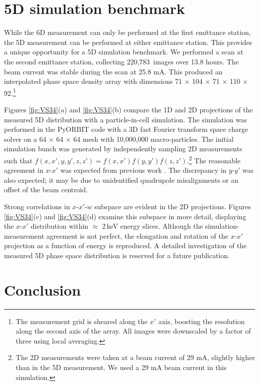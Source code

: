 \documentclass[letterpaper,
               nospread,
               biblatex,
              ]{jacow}
\begin{document}
\section{5D simulation benchmark}

While the 6D measurement can only be performed at the first emittance station, the 5D measurement can be performed at either emittance station. This provides a unique opportunity for a 5D simulation benchmark. We performed a scan at the second emittance station, collecting 220,783~images over 13.8 hours. The beam current was stable during the scan at 25.8 mA. This produced an interpolated phase space density array with dimensions 71 $\times$ 104 $\times$ 71 $\times$ 110 $\times$ 92.\footnote{
    The measurement grid is sheared along the $x'$ axis, boosting the resolution along the second axis of the array. All images were downscaled by a factor of three using local averaging.
} 


Figures \ref{fig:VS34}(a) and \ref{fig:VS34}(b) compare the 1D and 2D projections of the measured 5D distribution with a particle-in-cell simulation. The simulation was performed in the PyORBIT code with a 3D fast Fourier transform space charge solver on a 64 $\times$ 64 $\times$ 64 mesh with 10,000,000 macro-particles. The initial simulation bunch was generated by independently sampling 2D measurements such that $f(x,x',y,y',z,z') = f(x,x')f(y,y')f(z,z')$.\footnote{
    The 2D measurements were taken at a beam current of 29 mA, slightly higher than in the 5D measurement. We used a 29 mA beam current in this simulation.
} The reasonable agreement in $x$-$x'$ was expected from previous work \cite{Ruisard2021-IPAC}. The discrepancy in $y$-$y'$ was also expected; it may be due to unidentified quadrupole misalignments or an offset of the beam centroid. 

Strong correlations in $x$-$x'$-$w$ subspace are evident in the 2D projections. Figures \ref{fig:VS34}(c) and \ref{fig:VS34}(d) examine this subspace in more detail, displaying the $x$-$x'$ distribution within $\approx$ 2\,keV energy slices. Although the simulation-measurement agreement is not perfect, the elongation and rotation of the $x$-$x'$ projection as a function of energy is reproduced. A detailed investigation of the measured 5D phase space distribution is reserved for a future publication.


\section{Conclusion}
\end{document}
